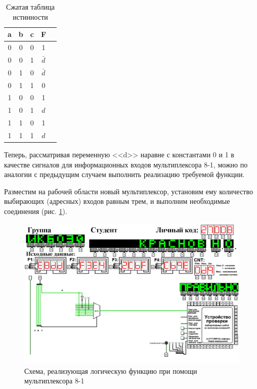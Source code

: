 \documentclass{mirea}
\begin{document}
\begin{table}[h!]
	\centering
	\caption{Сжатая таблица истинности}
	\label{table:Сжатая таблица для 8-1}
	\renewcommand{\arraystretch}{1.5}
	\begin{tabular}{c|c|c|c|c}
		\textbf{a} & \textbf{b} & \textbf{c} & \textbf{F} \\
		\hline
		0 & 0 & 0 & 1 \\
		\hline
		0 & 0 & 1 & $\bar{d}$ \\
		\hline
		0 & 1 & 0 & $\bar{d}$ \\
		\hline
		0 & 1 & 1 & 0 \\
		\hline
		1 & 0 & 0 & 1 \\
		\hline
		1 & 0 & 1 & $d$ \\
		\hline
		1 & 1 & 0 & 1 \\
		\hline
		1 & 1 & 1 & $d$ \\
	\end{tabular}
\end{table}

Теперь, рассматривая переменную <<d>> наравне с константами 0 и 1 в качестве сигналов для информационных входов мультиплексора 8-1, можно по аналогии с предыдущим случаем выполнить реализацию требуемой функции.

Разместим на рабочей области новый мультиплексор, установим ему количество выбирающих (адресных) входов равным трем, и выполним необходимые соединения (рис. \ref{circ:Мультиплекс 8-1}).

\begin{figure}[h!]
	\includegraphics[width=\textwidth]{Мультиплекс 8-1.png}
	\caption{Схема, реализующая логическую функцию при помощи мультиплексора 8-1}
	\label{circ:Мультиплекс 8-1}
\end{figure}
\end{document}
